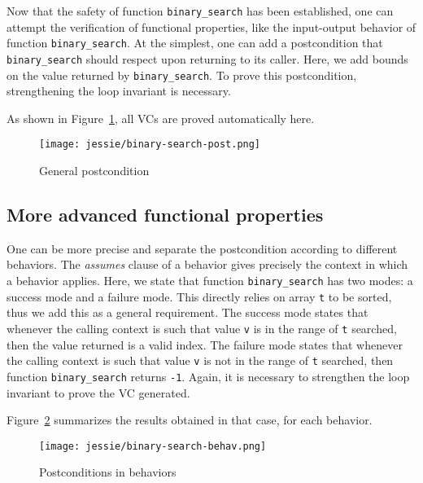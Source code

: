 \documentclass[a4paper,11pt,twoside,openright]{report}
\newcommand{\negtenthspace}{\hspace*{-0.1\linewidth}}
\begin{document}
Now that the safety of function \verb|binary_search| has been established, one
can attempt the verification of functional properties, like the
input-output behavior of function \verb|binary_search|. At the
simplest, one can add a postcondition that \verb|binary_search| should
respect upon returning to its caller. Here, we add bounds on the value
returned by \verb|binary_search|. To prove this postcondition,
strengthening the loop invariant is necessary.



As shown in Figure~\ref{fig:post}, all VCs are proved automatically here.

\begin{figure}[t]
  \begin{center}
    \negtenthspace\texttt{[image: jessie/binary-search-post.png]}
  \end{center}
  \caption{General postcondition}
  \label{fig:post}
  \hrulefill
\end{figure}

\subsection{More advanced functional properties}

One can be more precise and separate the postcondition according to
different behaviors. The \emph{assumes} clause of a behavior gives
precisely the context in which a behavior applies. Here, we state that
function \verb|binary_search| has two modes: a success mode and a
failure mode. This directly relies on array \verb|t| to be sorted,
thus we add this as a general requirement. The success mode states
that whenever the calling context is such that value \verb|v| is in
the range of \verb|t| searched, then the value returned is a valid
index. The failure mode states that whenever the calling context is
such that value \verb|v| is not in the range of \verb|t| searched,
then function \verb|binary_search| returns \verb|-1|.  Again, it is
necessary to strengthen the loop invariant to prove the VC generated.



Figure~\ref{fig:behav} summarizes the results obtained in that case,
for each behavior.

\begin{figure}[t]
  \begin{center}
    \negtenthspace\texttt{[image: jessie/binary-search-behav.png]}
  \end{center}
  \caption{Postconditions in behaviors}
  \label{fig:behav}
  \hrulefill
\end{figure}
\end{document}
